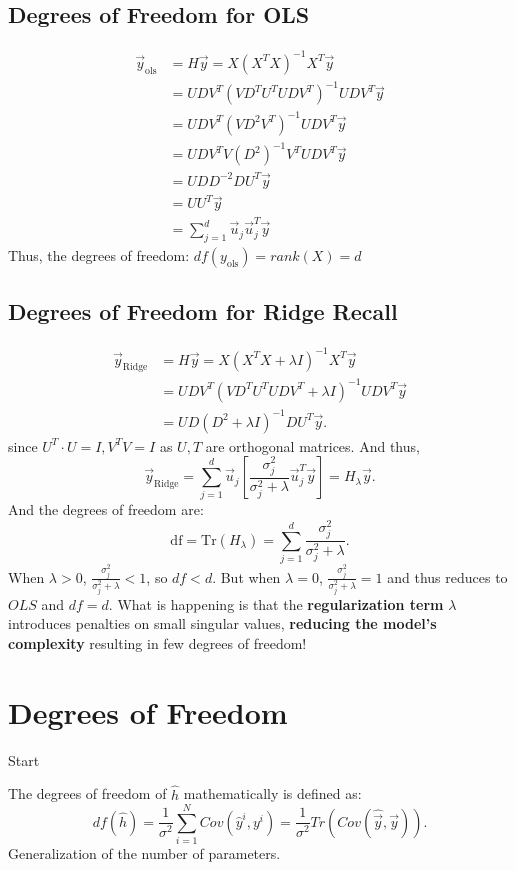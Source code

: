 \documentclass[a4paper]{article}
\begin{document}
\subsection{Degrees of Freedom for OLS}
\begin{align*}
  \vec{y}_{\text{ols}} &= H\vec{y} = X(X^T X)^{-1} X^T \vec{y} \\
&= U D V^T \left( V D^T U^T U D V^T \right)^{-1} U D V^T \vec{y} \\
&= U D V^T \left( V D^2 V^T \right)^{-1} U D V^T \vec{y} \\
&= U D V^T V \left( D^2 \right)^{-1} V^T U D V^T \vec{y} \\
&= U D D^{-2} D U^T \vec{y} \\
&= U U^T \vec{y} \\
&= \sum_{j=1}^d \vec{u}_j \vec{u}_j^T \vec{y}
\end{align*}
Thus, the degrees of freedom: $df(y_{\text{ols}}) = rank(X) = d$

\subsection{Degrees of Freedom for Ridge Recall}
\begin{align*}
  \vec{y}_{\text{Ridge}} &= H\vec{y} = X(X^T X + \lambda I)^{-1} X^T \vec{y} \\
                         &= U D V^T \left( V D^T U^T U D V^T + \lambda I \right)^{-1} U D V^T \vec{y} \\
                         &= U D \left( D^2 + \lambda I \right)^{-1} D U^T \vec{y}
.\end{align*}
since $U^T \cdot U = I, V^T V = I$ as $U,T$ are orthogonal matrices. And thus,
 \[
   \vec{y}_{\text{Ridge}} = \sum_{j=1}^d \vec{u}_j \left[ \frac{\sigma_j^2}{\sigma_j^2 + \lambda} \vec{u}_j^T \vec{y} \right] = H_\lambda \vec{y}
 .\] 
 And the degrees of freedom are:
\[
\text{df} = \text{Tr}(H_\lambda) = \sum_{j=1}^d \frac{\sigma_j^2}{\sigma_j^2 + \lambda}
.\]
When $\lambda > 0$, $\frac{\sigma_j^2}{\sigma_j^2 + \lambda} < 1$, so $df < d$. But when $\lambda = 0$, $\frac{\sigma_j^2}{\sigma_j^2 + \lambda} = 1$ and thus reduces to $OLS$ and 
$df = d$. What is happening is that the \textbf{regularization term} $\lambda$ introduces penalties on small singular values, \textbf{
reducing the model's complexity} resulting in few degrees of freedom!

\section{Degrees of Freedom}
Start
\begin{definition}
  The degrees of freedom of $\hat{h}$ mathematically is defined as:
  \[
    df(\hat{h}) = \frac{1}{\sigma^2} \sum_{i=1}^N Cov(\hat{y}^i, y^i) = \frac{1}{\sigma^2} Tr(Cov(\hat{\vec{y}}, \vec{y}))
  .\] 
  Generalization of the number of parameters.
\end{definition}
\end{document}
